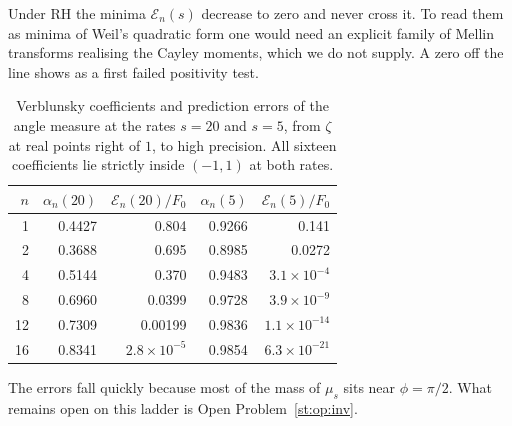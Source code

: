Under RH the minima $\mathcal E_n(s)$ decrease to zero and never cross it. To read them as minima of Weil's quadratic form one would need an explicit family of Mellin transforms realising the Cayley moments, which we do not supply. A zero off the line shows as a first failed positivity test.
\begin{table}[h]\centering\small
\begin{tabular}{rrrrr}
\toprule
$n$ & $\alpha_n(20)$ & $\mathcal E_n(20)/F_0$ & $\alpha_n(5)$ & $\mathcal E_n(5)/F_0$\\
\midrule
1 & 0.4427 & 0.804 & 0.9266 & 0.141\\
2 & 0.3688 & 0.695 & 0.8985 & 0.0272\\
4 & 0.5144 & 0.370 & 0.9483 & $3.1\times10^{-4}$\\
8 & 0.6960 & 0.0399 & 0.9728 & $3.9\times10^{-9}$\\
12 & 0.7309 & 0.00199 & 0.9836 & $1.1\times10^{-14}$\\
16 & 0.8341 & $2.8\times10^{-5}$ & 0.9854 & $6.3\times10^{-21}$\\
\bottomrule
\end{tabular}
\caption{Verblunsky coefficients and prediction errors of the angle measure at the rates $s=20$ and $s=5$, from $\zeta$ at real points right of $1$, to high precision. All sixteen coefficients lie strictly inside $(-1,1)$ at both rates.}\label{st:tab:verb}
\end{table}
The errors fall quickly because most of the mass of $\mu_s$ sits near $\phi=\pi/2$. What remains open on this ladder is Open Problem~\ref{st:op:inv}.

